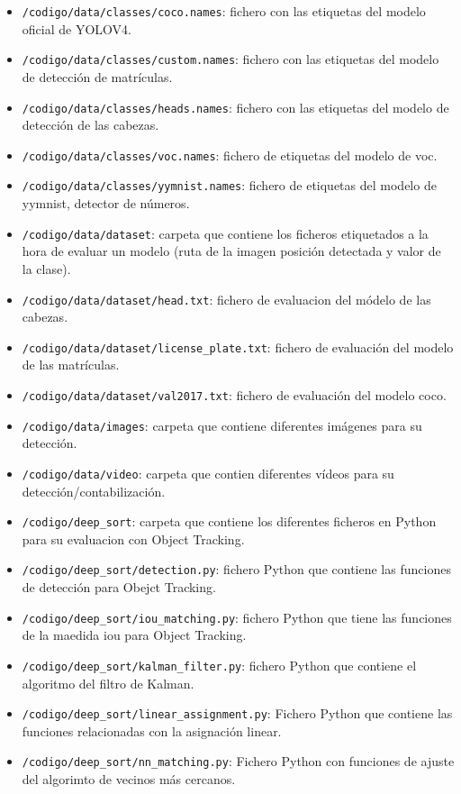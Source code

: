 \begin{itemize}
    \item \texttt{/codigo/data/classes/coco.names}: fichero con las etiquetas del modelo oficial de YOLOV4.
    \item \texttt{/codigo/data/classes/custom.names}: fichero con las etiquetas del modelo de detección de matrículas.
    \item \texttt{/codigo/data/classes/heads.names}: fichero con las etiquetas del modelo de detección de las cabezas.
    \item \texttt{/codigo/data/classes/voc.names}: fichero de etiquetas del modelo de voc.
    \item \texttt{/codigo/data/classes/yymnist.names}: fichero de etiquetas del modelo de yymnist, detector de números.
    \item \texttt{/codigo/data/dataset}: carpeta que contiene los ficheros etiquetados a la hora de evaluar un modelo (ruta de la imagen posición detectada y valor de la clase).
    \item \texttt{/codigo/data/dataset/head.txt}: fichero de evaluacion del módelo de las cabezas. 
    \item \texttt{/codigo/data/dataset/license\_plate.txt}: fichero de evaluación del modelo de las matrículas.
    \item \texttt{/codigo/data/dataset/val2017.txt}: fichero de evaluación del modelo coco.
    \item \texttt{/codigo/data/images}: carpeta que contiene diferentes imágenes para su detección.
    \item \texttt{/codigo/data/video}: carpeta que contien diferentes vídeos para su detección/contabilización.
    \item \texttt{/codigo/deep\_sort}: carpeta que contiene los diferentes ficheros en Python para su evaluacion con Object Tracking.
    \item \texttt{/codigo/deep\_sort/detection.py}: fichero Python que contiene las funciones de detección para Obejct Tracking.
    \item \texttt{/codigo/deep\_sort/iou\_matching.py}: fichero Python que tiene las funciones de la maedida iou para Object Tracking.
    \item \texttt{/codigo/deep\_sort/kalman\_filter.py}: fichero Python que contiene el algoritmo del filtro de Kalman\cite{kalman_filter}.  
    \item \texttt{/codigo/deep\_sort/linear\_assignment.py}: Fichero Python que contiene las funciones relacionadas con la asignación linear.
    \item \texttt{/codigo/deep\_sort/nn\_matching.py}: Fichero Python con funciones de ajuste del algorimto de vecinos más cercanos\cite{knn}.

\end{itemize}

